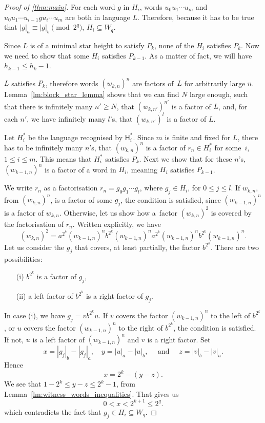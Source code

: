 \begin{proof}[Proof of \autoref*{thm:main}]
    For each word $g$ in $H_i$, words $u_0 u_1 \dotsm u_m$ and $u_0 u_1 \dotsm u_{i-1} g u_i \dotsm u_m$ are both in language $L$. Therefore, because it has to be true that $|g|_a \equiv |g|_b \pmod{2^q}$, $H_i \subseteq W_q$.

    Since $L$ is of a minimal star height to satisfy $P_k$, none of the $H_i$ satisfies $P_k$. Now we need to show that some $H_i$ satisfies $P_{k-1}$. As a matter of fact, we will have $h_{k-1} \leq h_k - 1$.

    $L$ satisfies $P_k$, therefore words ${(w_{k,n})}^n$ are factors of~$L$ for arbitrarily large $n$. Lemma~\ref*{lm:block_star_lemma} shows that we can find $N$ large enough, such that there is infinitely many $n' \geq N$, that ${(w_{k,n'})}^{n'}$ is a factor of $L$, and, for each $n'$, we have infinitely many $l$'s, that ${(w_{k,n'})}^l$ is a factor of $L$.

    Let $H_i^*$ be the language recognised by $\mathsf{H}_i^*$. Since $m$ is finite and fixed for $L$, there has to be infinitely many $n$'s, that ${(w_{k,n})}^n$ is a factor of $r_n \in H_i^*$ for some~$i$, $1 \leq i \leq m$. This means that $H_i^*$ satisfies $P_k$. Next we show that for these $n$'s, ${(w_{k-1,n})}^n$ is a factor of a word in $H_i$, meaning $H_i$ satisfies $P_{k-1}$.

    We write $r_n$ as a factorisation $r_n = g_0 g_1 \dotsm g_l$, where $g_j \in H_i$, for $0 \leq j \leq l$. If $w_{k,n}$, from ${(w_{k,n})}^n$, is a factor of some $g_j$, the condition is satisfied, since ${(w_{k-1,n})}^n$ is a factor of $w_{k,n}$. Otherwise, let us show how a~factor ${(w_{k,n})}^2$ is covered by the factorisation of $r_n$. Written explicitly, we have
    \[
        {(w_{k,n})}^2 = a^{2^k}{(w_{k-1,n})}^{n}b^{2^k}{(w_{k-1,n})}^{n}a^{2^k}{(w_{k-1,n})}^{n}b^{2^k}{(w_{k-1,n})}^{n}.
    \]
    Let us consider the $g_j$ that covers, at least partially, the factor $b^{2^k}$. There are two possibilities:
    \begin{itemize}
        \item[(i)] $b^{2^k}$ is a factor of $g_j$,
        \item[(ii)] a left factor of $b^{2^k}$ is a right factor of $g_j$.
    \end{itemize}

    In case (i), we have $g_j = v b^{2^k} u$. If $v$ covers the factor ${(w_{k-1,n})}^{n}$ to the left of $b^{2^k}$, or $u$ covers the factor ${(w_{k-1,n})}^{n}$ to the right of $b^{2^k}$, the condition is satisfied. If not, $u$ is a left factor of ${(w_{k-1,n})}^{n}$ and $v$ is a right factor. Set
    \[
        x = |g_j|_b - |g_j|_a, \quad y = |u|_a - |u|_b, \quad \text{ and } \quad z = |v|_b - |v|_a.
    \]
    Hence
    \[
        x = 2^k - (y - z).
    \]
    We see that $1 - 2^k \leq y - z \leq 2^k - 1$, from Lemma~\ref*{lm:witness_words_inequalities}. That gives us
    \[
        0 < x < 2^{k+1} \leq 2^q.
    \]
    which contradicts the fact that $g_j \in H_i \subseteq W_q$.


\end{proof}
